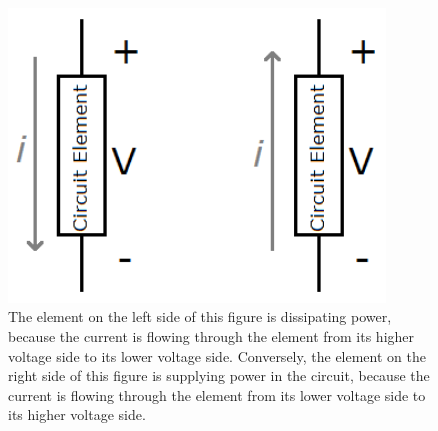 \begin{figure}[h!]
\centering
\includegraphics[width=10cm]{figures/powerSuppliedDissipated.png}
\caption{The element on the left side of this figure is dissipating power, because the current is flowing through the element from its higher voltage side to its lower voltage side. Conversely, the element on the right side of this figure is supplying power in the circuit, because the current is flowing through the element from its lower voltage side to its higher voltage side.}
\label{powerSuppliedDissipated}
\end{figure}

